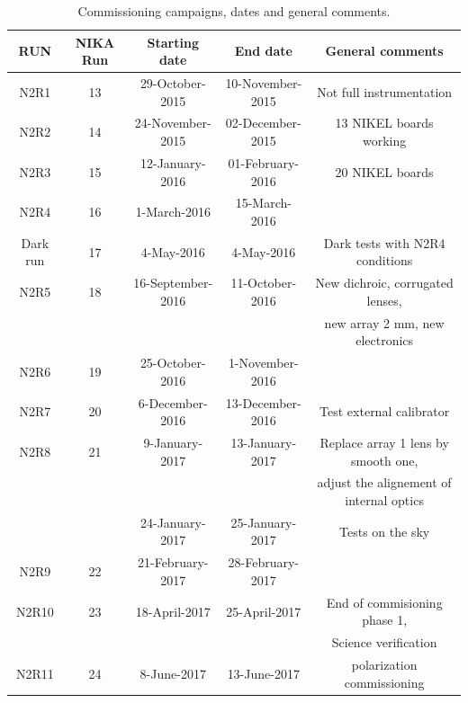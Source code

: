\documentclass[a4paper, 11pt]{article} %
\begin{document}
\begin{table}[h]
\small
\caption{Commissioning campaigns, dates and general comments.
\label{nika2runs}}
\begin{tabular}{|c|c|c|c|c|}
\hline 
RUN  & NIKA Run & Starting date    & End date         &  General comments \\
\hline
N2R1     & 13       & 29-October-2015   & 10-November-2015 & Not full instrumentation        \\
N2R2     & 14       & 24-November-2015  & 02-December-2015 & 13 NIKEL boards working         \\
N2R3     & 15       & 12-January-2016   & 01-February-2016 & 20 NIKEL boards                 \\
N2R4     & 16       & 1-March-2016      & 15-March-2016    & 	                               \\
Dark run & 17       & 4-May-2016        & 4-May-2016       & Dark tests with N2R4 conditions  \\
\hline
N2R5     & 18       & 16-September-2016 & 11-October-2016  & New dichroic, corrugated lenses, \\
         &          &                   &                  &  new array 2 mm, new electronics \\
N2R6     & 19       & 25-October-2016   & 1-November-2016  &                                  \\
N2R7     & 20       & 6-December-2016   & 13-December-2016 & Test external calibrator         \\
N2R8     & 21       & 9-January-2017    & 13-January-2017  & Replace array 1 lens by smooth one, \\
         &          &                   &                  &  adjust the alignement of internal optics \\ 
         &          & 24-January-2017   & 25-January-2017  & Tests on the sky   \\
N2R9     & 22       & 21-February-2017  & 28-February-2017 &                                   \\
N2R10    & 23       & 18-April-2017     & 25-April-2017    & End of commisioning phase 1,     \\
         &          &                   &                  & Science verification  \\  
N2R11  & 24       &  8-June-2017   & 13-June-2017  &  polarization commissioning  \\
\hline
\end{tabular} 
\end{table} 
\end{document}

